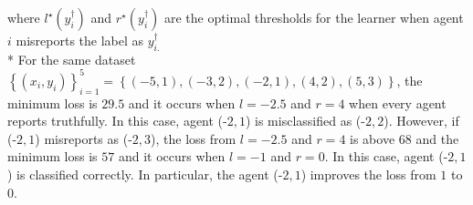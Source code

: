 \documentclass{article}
\begin{document}
where $l^\star \left(y^{\dagger}_{i}\right)$ and $r^\star \left(y^{\dagger}_{i}\right)$ are the optimal thresholds for the learner when agent $i $ misreports the label as $y^{\dagger}_{i.}$
\\* For the same dataset $\left\{\left(x_{i}, y_{i}\right)\right\}_{i=1}^{5} = \left\{\left(-5, 1\right), \left(-3, 2\right), \left(-2, 1\right), \left(4, 2\right), \left(5, 3\right)\right\}$, the minimum loss is $29.5$ and it occurs when $l  = -2.5$ and $r = 4$ when every agent reports truthfully. In this case, agent (-$2, 1$) is misclassified as (-$2, 2$). However, if (-$2, 1$) misreports as (-$2, 3$), the loss from $l  = -2.5$ and $r = 4$ is above $68$ and the minimum loss is $57$ and it occurs when $l  = -1$ and $r  = 0$. In this case, agent (-$2, 1$) is classified correctly. In particular, the agent (-$2, 1$) improves the loss from $1$ to $0$.
\newline \newline

\begin{figure}[H] \centering {} \label{fig:2dat}
\end{figure}
\end{document}
